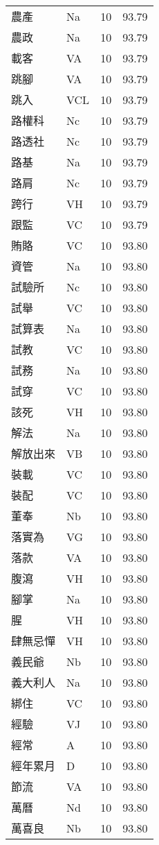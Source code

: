 \documentclass[twocolumn]{book}
\begin{document}
\begin{supertabular}{llrr}
農產 & Na & 10 &  93.79\\
農政 & Na & 10 &  93.79\\
載客 & VA & 10 &  93.79\\
跳腳 & VA & 10 &  93.79\\
跳入 & VCL & 10 &  93.79\\
路權科 & Nc & 10 &  93.79\\
路透社 & Nc & 10 &  93.79\\
路基 & Na & 10 &  93.79\\
路肩 & Nc & 10 &  93.79\\
跨行 & VH & 10 &  93.79\\
跟監 & VC & 10 &  93.79\\
賄賂 & VC & 10 &  93.80\\
資管 & Na & 10 &  93.80\\
試驗所 & Nc & 10 &  93.80\\
試舉 & VC & 10 &  93.80\\
試算表 & Na & 10 &  93.80\\
試教 & VC & 10 &  93.80\\
試務 & Na & 10 &  93.80\\
試穿 & VC & 10 &  93.80\\
該死 & VH & 10 &  93.80\\
解法 & Na & 10 &  93.80\\
解放出來 & VB & 10 &  93.80\\
裝載 & VC & 10 &  93.80\\
裝配 & VC & 10 &  93.80\\
董奉 & Nb & 10 &  93.80\\
落實為 & VG & 10 &  93.80\\
落款 & VA & 10 &  93.80\\
腹瀉 & VH & 10 &  93.80\\
腳掌 & Na & 10 &  93.80\\
腥 & VH & 10 &  93.80\\
肆無忌憚 & VH & 10 &  93.80\\
義民爺 & Nb & 10 &  93.80\\
義大利人 & Na & 10 &  93.80\\
綁住 & VC & 10 &  93.80\\
經驗 & VJ & 10 &  93.80\\
經常 & A & 10 &  93.80\\
經年累月 & D & 10 &  93.80\\
節流 & VA & 10 &  93.80\\
萬曆 & Nd & 10 &  93.80\\
萬喜良 & Nb & 10 &  93.80\\

\end{supertabular}
\end{document}
